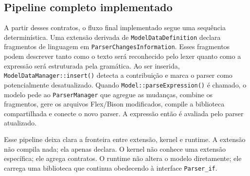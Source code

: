 \documentclass[12pt,a4paper]{article}
\begin{document}
\subsection{Pipeline completo implementado}

A partir desses contratos, o fluxo final implementado segue uma sequ\^encia determin\'istica. Uma extens\~ao derivada de \texttt{ModelDataDefinition} declara fragmentos de linguagem em \texttt{ParserChangesInformation}. Esses fragmentos podem descrever tanto como o texto ser\'a reconhecido pelo lexer quanto como a express\~ao ser\'a estruturada pela gram\'atica. Ao ser inserida, \texttt{ModelDataManager::insert()} detecta a contribui\c{c}\~ao e marca o parser como potencialmente desatualizado. Quando \texttt{Model::parseExpression()} \'e chamado, o modelo pede ao \texttt{ParserManager} que agregue as mudan\c{c}as, combine os fragmentos, gere os arquivos Flex/Bison modificados, compile a biblioteca compartilhada e conecte o novo parser. A express\~ao ent\~ao \'e avaliada pelo parser atualizado.

Esse pipeline deixa clara a fronteira entre extens\~ao, kernel e runtime. A extens\~ao n\~ao compila nada; ela apenas declara. O kernel n\~ao conhece uma extens\~ao espec\'ifica; ele agrega contratos. O runtime n\~ao altera o modelo diretamente; ele carrega uma biblioteca que continua obedecendo \`a interface \texttt{Parser\_if}.
\end{document}
